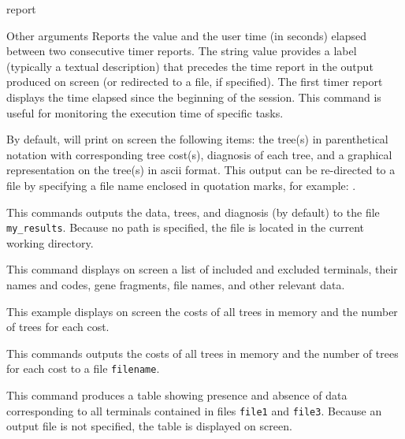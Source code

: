 \begin{command}{report}{}
\begin{arguments}
\begin{argumentgroup}{Other arguments}
                {Reports the value and the user time (in seconds) elapsed between
                two consecutive timer reports. The string value provides a label
                (typically a textual description) that precedes the time report
                in the output produced on screen (or redirected to a file, if specified).
                The first timer report displays the time elapsed since the beginning of the
                \poy session. This command is useful for monitoring the execution time
                of specific tasks.}
                {}

		\end{argumentgroup}
	\end{arguments}

        {By default, \poy will print on screen the following items: the tree(s)
        in parenthetical notation with corresponding tree cost(s), diagnosis of
        each tree, and a graphical representation on the tree(s) in ascii
        format. This output can be re-directed to a file by specifying a file
        name enclosed in quotation marks, for example:
        .}

	\begin{poyexamples} 

		{This commands outputs the data, trees, and diagnosis (by default) to the
		file \texttt{my\_results}. Because no path is specified, the
		file is located in the current working directory.}
		
            {This command displays on screen a list of included and excluded terminals, their
            names and codes, gene fragments, file names, and other relevant data.}
            
            {This example displays on screen the costs of all trees in memory and the
            number of trees for each cost.}

            {This commands outputs the costs of all trees in memory and the
            number of trees for each cost to a file \texttt{filename}.}

		{This command produces a table showing presence
		and absence of data corresponding to all terminals contained
		in files \texttt{file1} and \texttt{file3}. Because an output
		file is not specified, the table is displayed on screen.}
		

\end{poyexamples}
\end{command}
